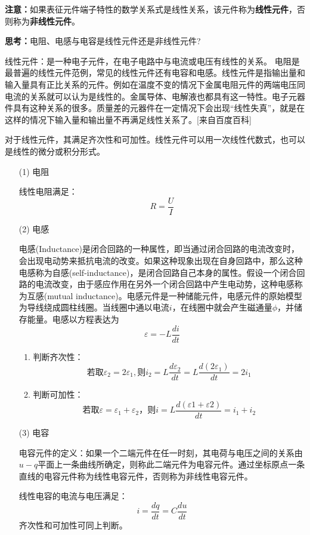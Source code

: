 \documentclass[11pt,a4paper,oneside]{book}
\begin{document}
\textbf{注意：}如果表征元件端子特性的数学关系式是线性关系，该元件称为\textbf{线性元件}，否则称为\textbf{非线性元件}。

\textbf{思考：}电阻、电感与电容是线性元件还是非线性元件?

线性元件：是一种电子元件，在电子电路中与电流或电压有线性的关系。
电阻是最普遍的线性元件范例，常见的线性元件还有电容和电感。线性元件是指输出量和输入量具有正比关系的元件。例如在温度不变的情况下金属电阻元件的两端电压同电流的关系就可以认为是线性的。金属导体、电解液也都具有这一特性。电子元器件具有这种关系的很多。质量差的元器件在一定情况下会出现“线性失真”，就是在这样的情况下输入量和输出量不再满足线性关系了。[来自百度百科]

对于线性元件，其满足齐次性和可加性。线性元件可以用一次线性代数式，也可以是线性的微分或积分形式。
\begin{enumerate}
	\item[(1)]电阻
	
	线性电阻满足：
	\begin{equation}
		R=\frac{U}{I}
	\end{equation}
	\item[(2)]电感
	
	电感(Inductance)是闭合回路的一种属性，即当通过闭合回路的电流改变时，会出现电动势来抵抗电流的改变。如果这种现象出现在自身回路中，那么这种电感称为自感(self-inductance)，是闭合回路自己本身的属性。假设一个闭合回路的电流改变，由于感应作用在另外一个闭合回路中产生电动势，这种电感称为互感(mutual inductance)。电感元件是一种储能元件，电感元件的原始模型为导线绕成圆柱线圈。当线圈中通以电流$i$，在线圈中就会产生磁通量$\phi$，并储存能量。电感以方程表达为
	\begin{equation}
		\varepsilon=-L\frac{di}{dt}
	\end{equation}
	\begin{enumerate}
		\item 判断齐次性：
		\begin{equation}
			\mbox{若取}\varepsilon_2=2\varepsilon_1,\mbox{则}i_2=L\frac{d\varepsilon_2}{dt}=L\frac{d(2\varepsilon_1)}{dt}=2i_1
		\end{equation}
		\item 判断可加性：
		\begin{equation}
			\mbox{若取}\varepsilon=\varepsilon_1+\varepsilon_2\mbox{，则}i=L\frac{d(\varepsilon1+\varepsilon2)}{dt}=i_1+i_2
		\end{equation}
		
	\end{enumerate}
	\item[(3)]电容
	
	电容元件的定义：如果一个二端元件在任一时刻，其电荷与电压之间的关系由$u-q$平面上一条曲线所确定，则称此二端元件为电容元件。通过坐标原点一条直线的电容元件称为线性电容元件，否则称为非线性电容元件。
	
	线性电容的电流与电压满足：
	\begin{equation}
		i=\frac{dq}{dt}=C\frac{du}{dt}
	\end{equation}
	齐次性和可加性可同上判断。
\end{enumerate}
\end{document}
